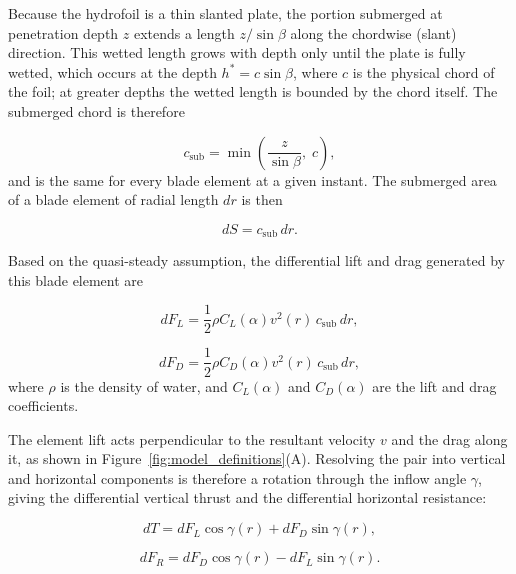 Because the hydrofoil is a thin slanted plate, the portion submerged at penetration depth $z$ extends a length $z/\sin{\beta}$ along the chordwise (slant) direction. This wetted length grows with depth only until the plate is fully wetted, which occurs at the depth $h^{*} = c\sin{\beta}$, where $c$ is the physical chord of the foil; at greater depths the wetted length is bounded by the chord itself. The submerged chord is therefore

\begin{equation}
    c_{\mathrm{sub}} = \min\!\left(\frac{z}{\sin{\beta}},\; c\right),
    \label{eq:submerged_chord}
\end{equation}
and is the same for every blade element at a given instant. The submerged area of a blade element of radial length $dr$ is then

\begin{equation}
    dS = c_{\mathrm{sub}}\,dr .
    \label{eq:blade_area}
\end{equation}

Based on the quasi-steady assumption, the differential lift and drag generated by this blade element are

\begin{equation}
    dF_L = \frac{1}{2}\rho C_L(\alpha) v^2(r)\,c_{\mathrm{sub}}\,dr ,
    \label{eq:differential_lift}
\end{equation}

\begin{equation}
    dF_D = \frac{1}{2}\rho C_D(\alpha) v^2(r)\,c_{\mathrm{sub}}\,dr ,
    \label{eq:differential_drag}
\end{equation}
where $\rho$ is the density of water, and $C_L(\alpha)$ and $C_D(\alpha)$ are the lift and drag coefficients.

The element lift acts perpendicular to the resultant velocity $v$ and the drag
along it, as shown in Figure~\ref{fig:model_definitions}(A).  Resolving the
pair into vertical and horizontal components is therefore a rotation through
the inflow angle $\gamma$, giving the differential vertical thrust and the
differential horizontal resistance:

\begin{equation}
    dT = dF_L \cos{\gamma(r)} + dF_D \sin{\gamma(r)} ,
    \label{eq:differential_thrust}
\end{equation}

\begin{equation}
    dF_R = dF_D \cos{\gamma(r)} - dF_L \sin{\gamma(r)} .
    \label{eq:differential_resistance}
\end{equation}

